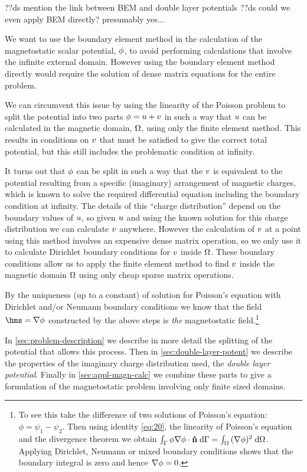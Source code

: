 ??ds mention the link between BEM and double layer potentials
??ds could we even apply BEM directly? presumably yes...


We want to use the boundary element method in the calculation of the magnetostatic scalar potential, $\phi$, to avoid performing calculations that involve the infinite external domain.
However using the boundary element method directly would require the solution of dense matrix equations for the entire problem.

We can circumvent this issue by using the linearity of the Poisson problem to split the potential into two parts $\phi = u + v$ in such a way that $u$ can be calculated in the magnetic domain, $\Omega$, using only the finite element method.
This results in conditions on $v$ that must be satisfied to give the correct total potential, but this still includes the problematic condition at infinity.

It turns out that $\phi$ can be split in such a way that the $v$ is equivalent to the potential resulting from a specific (imaginary) arrangement of magnetic charges, which is known to solve the required differential equation including the boundary condition at infinity.
The details of this ``charge distribution'' depend on the boundary values of $u$, so given $u$ and using the known solution for this charge distribution we can calculate $v$ anywhere.
However the calculation of $v$ at a point using this method involves an expensive dense matrix operation, so we only use it to calculate Dirichlet boundary conditions for $v$ inside $\Omega$.
These boundary conditions allow us to apply the finite element method to find $v$ inside the magnetic domain $\Omega$ using only cheap sparse matrix operations.

By the uniqueness (up to a constant) of solution for Poisson's equation with Dirichlet and/or Neumann boundary conditions we know that the field $ \hms = \grad \phim$  constructed by the above steps is \emph{the} magnetostatic field.\footnote{To see this take the difference of two solutions of Poisson's equation: $\phi = \psi_1 - \psi_2$.
Then using identity \cref{eq:20}, the linearity of Poisson's equation and the divergence theorem we obtain ${\int_{{\Gamma}} {\phi \nabla \phi \cdot \boldsymbol{\mathrm{\hat{n}}}} {\; \mathrm{{d}}} {{\Gamma}}} = {\int_{\Omega} {(\nabla \phi)^2 } {\; \mathrm{{d}}} {\Omega}}$.
Applying Dirichlet, Neumann or mixed boundary conditions shows that the boundary integral is zero and hence $\nabla \phi = 0$.}

In \cref{sec:problem-description} we describe in more detail the splitting of the potential that allows this process.
Then in \cref{sec:double-layer-potent} we describe the properties of the imaginary charge distribution used, the \emph{double layer potential}.
Finally in \cref{sec:appl-magn-calc} we combine these parts to give a formulation of the magnetostatic problem involving only finite sized domains.

